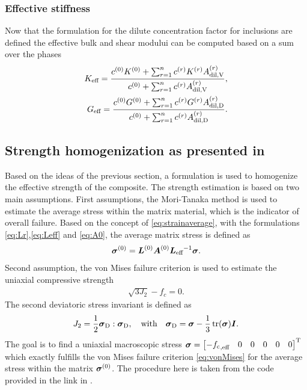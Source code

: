 \subsubsection{Effective stiffness}
Now that the formulation for the dilute concentration factor for inclusions are defined the effective bulk and shear modului can be computed based on a sum over the phases
\begin{align}
K_{\text{eff}} = \dfrac{c^{(0)}K^{(0)} + \sum^{n}_{r=1} c^{(r)} K^{(r)} A^{(r)}_{\text{dil,V}}}{c^{(0)} + \sum^{n}_{r=1} c^{(r)} A^{(r)}_{\text{dil,V}}},\label{eq:keff} \\
G_{\text{eff}} = \dfrac{c^{(0)}G^{(0)} + \sum^{n}_{r=1} c^{(r)} G^{(r)} A^{(r)}_{\text{dil,D}}}{c^{(0)} + \sum^{n}_{r=1} c^{(r)} A^{(r)}_{\text{dil,D}}}.\label{eq:geff}
\end{align}
\subsection{Strength homogenization as presented in \cite{nev_2018_mcam}}
Based on the ideas of the previous section, a formulation is used to homogenize the effective strength of the composite.
The strength estimation is based on two main assumptions.
First assumptions, the Mori-Tanaka method is used to estimate the average stress within the matrix material, which is the indicator of overall failure.
Based on the concept of \eqref{eq:strainaverage}, with the formulations \eqref{eq:Lr},\eqref{eq:Leff} and \eqref{eq:A0}, the average matrix stress is defined as 
\begin{align}
	\boldsymbol{\sigma}^{(0)} = \boldsymbol{L}^{(0)}\boldsymbol{A}^{(0)} {\boldsymbol{L}_{\text{eff}}}^{-1}\boldsymbol{\sigma}. \label{eq:matrixstress}
\end{align}
Second assumption, the von Mises failure criterion is used to estimate the uniaxial compressive strength
\begin{align}
	\sqrt{3 J_2} - {f_c} = 0. \label{eq:vonMises}
\end{align}
The second deviatoric stress invariant is defined as
\begin{align}
	J_2 = \frac{1}{2} \boldsymbol{\sigma}_{\text{D}}:\boldsymbol{\sigma}_{\text{D}},\quad\text{with}\quad
	\boldsymbol{\sigma}_{\text{D}} = \boldsymbol{\sigma} - \frac{1}{3}\operatorname{tr}(\boldsymbol{\sigma})\boldsymbol{I}.
\end{align}
The goal is to find a uniaxial macroscopic stress $\boldsymbol{\sigma} = \begin{bmatrix} -{f_{\text{c}}}_{,\text{eff}} & 0 & 0 &0&0&0 \end{bmatrix}^\text{T}$ which exactly fulfills the von Mises failure criterion \eqref{eq:vonMises} for the average stress within the matrix $\boldsymbol{\sigma}^{(0)}$.
The procedure here is taken from the code provided in the link in \cite{nee_2012_ammf}.

